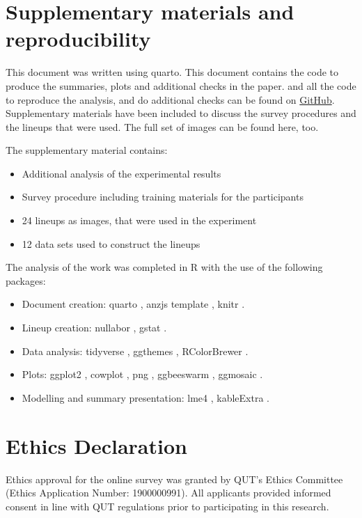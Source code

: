 \documentclass[
doublespace,
  times]{anzsauth}
\providecommand{\tightlist}{%
  \setlength{\itemsep}{0pt}\setlength{\parskip}{0pt}}
\begin{document}
\section*{Supplementary materials and
reproducibility}\label{supplementary-materials-and-reproducibility}

This document was written using quarto. This document contains the code
to produce the summaries, plots and additional checks in the paper. and
all the code to reproduce the analysis, and do additional checks can be
found on \href{https://github.com/srkobakian/experiment/paper}{GitHub}.
Supplementary materials have been included to discuss the survey
procedures and the lineups that were used. The full set of images can be
found here, too.

The supplementary material contains:

\begin{itemize}
\tightlist
\item
  Additional analysis of the experimental results
\item
  Survey procedure including training materials for the participants
\item
  24 lineups as images, that were used in the experiment
\item
  12 data sets used to construct the lineups
\end{itemize}

The analysis of the work was completed in R \citep{RCore} with the use
of the following packages:

\begin{itemize}
\tightlist
\item
  Document creation: quarto \citep{Allaire_Quarto_2025}, anzjs template
  \citep{quarto-anzjs}, knitr \citep{knitr}.
\item
  Lineup creation: nullabor \citep{nullabor}, gstat \citep{gstat}.
\item
  Data analysis: tidyverse \citep{tidyverse}, ggthemes \citep{ggthemes},
  RColorBrewer \citep{RColorBrewer}.
\item
  Plots: ggplot2 \citep{ggplot2}, cowplot \citep{cowplot}, png
  \citep{png}, ggbeeswarm \citep{ggbeeswarm}, ggmosaic \citep{ggmosaic}.
\item
  Modelling and summary presentation: lme4 \citep{lme4}, kableExtra
  \citep{kableExtra}.
\end{itemize}

\section*{Ethics Declaration}\label{ethics-declaration}

Ethics approval for the online survey was granted by QUT's Ethics
Committee (Ethics Application Number: 1900000991). All applicants
provided informed consent in line with QUT regulations prior to
participating in this research.



\end{document}
